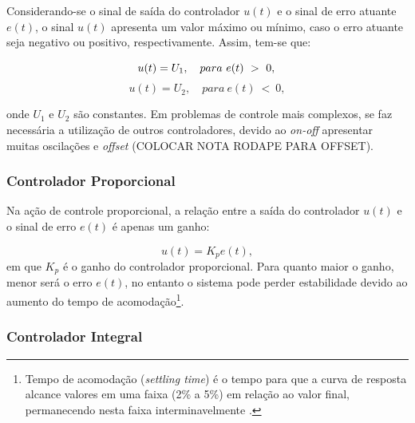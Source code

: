 Considerando-se o sinal de saída do controlador $u(t)$ %
e o sinal de erro atuante $e(t)$, o sinal $u(t)$ apresenta um valor máximo ou mínimo, caso o erro atuante seja negativo ou positivo, 
respectivamente. Assim, tem-se que:

\begin{equation}
 u(t) = U_1, \quad para \ e(t) \ > \ 0, \\ 
\end{equation}
\begin{equation}
 u(t) = U_2, \quad para \ e(t) \ < \ 0,
\end{equation}

onde $U_1$ e $U_2$ são constantes.
Em problemas de controle mais complexos, se faz necessária a utilização de outros controladores, devido ao \textit{on-off} apresentar 
muitas oscilações e \textit{offset} (COLOCAR NOTA RODAPE PARA OFFSET).

\subsubsection{Controlador Proporcional}


Na ação de controle proporcional, a relação entre a saída do controlador $u(t)$ e o sinal de erro $e(t)$ 
é apenas um ganho: 

\begin{equation}\label{eq:prop}
 u(t) = K_pe(t),	
\end{equation}
em que $K_p$ é o ganho do controlador proporcional. 
Para  quanto maior o ganho, menor será o erro $e(t)$, no entanto o sistema pode perder estabilidade 
devido ao aumento do 
tempo de acomodação\footnote{Tempo de acomodação (\textit{settling time}) é o tempo para que a curva de resposta alcance 
valores em uma faixa (2\% a 5\%) em relação ao valor final, permanecendo nesta faixa interminavelmente \cite{ogata}.}.

\subsubsection{Controlador Integral}

